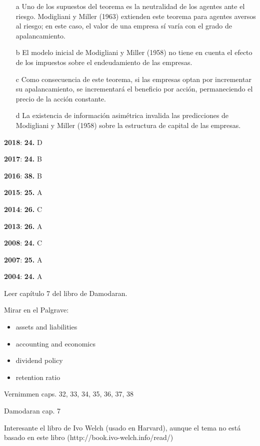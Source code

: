 \documentclass{nuevotema}
\begin{document}
\begin{enumerate}
	\item[a] Uno de los supuestos del teorema es la neutralidad de los agentes ante el riesgo. Modigliani y Miller (1963) extienden este teorema para agentes aversos al riesgo; en este caso, el valor de una empresa sí varía con el grado de apalancamiento.
	\item[b] El modelo inicial de Modigliani y Miller (1958) no tiene en cuenta el efecto de los impuestos sobre el endeudamiento de las empresas.
	\item[c] Como consecuencia de este teorema, si las empresas optan por incrementar su apalancamiento, se incrementará el beneficio por acción, permaneciendo el precio de la acción constante.
	\item[d] La existencia de información asimétrica invalida las predicciones de Modigliani y Miller (1958) sobre la estructura de capital de las empresas.
\end{enumerate}

\notas

\textbf{2018}: \textbf{24.} D

\textbf{2017}: \textbf{24.} B

\textbf{2016}: \textbf{38.} B

\textbf{2015}: \textbf{25.} A

\textbf{2014}: \textbf{26.} C

\textbf{2013}: \textbf{26.} A

\textbf{2008}: \textbf{24.} C

\textbf{2007}: \textbf{25.} A

\textbf{2004}: \textbf{24.} A

Leer capítulo 7 del libro de Damodaran.

\bibliografia


Mirar en el Palgrave:
\begin{itemize}
    \item assets and liabilities
    \item accounting and economics
    \item dividend policy
    \item retention ratio
\end{itemize}

Vernimmen caps. 32, 33, 34, 35, 36, 37, 38

Damodaran cap. 7

Interesante el libro de Ivo Welch (usado en Harvard), aunque el tema no está basado en este libro (http://book.ivo-welch.info/read/)
\end{document}
